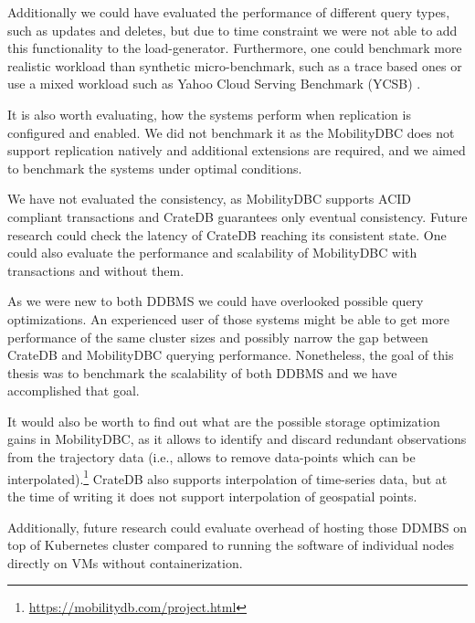 Additionally we could have evaluated the performance of different query types, such as updates and deletes, but due to time constraint we were not able to add this functionality to the load-generator.
Furthermore, one could benchmark more realistic workload than synthetic micro-benchmark, such as a trace based ones or use a mixed workload such as Yahoo Cloud Serving Benchmark (YCSB) \cite{cooperBenchmarkingCloudServing2010}.

It is also worth evaluating, how the systems perform when replication is configured and enabled.
We did not benchmark it as the MobilityDBC does not support replication natively and additional extensions are required, and we aimed to benchmark the systems under optimal conditions.

We have not evaluated the consistency, as MobilityDBC supports ACID compliant transactions and CrateDB guarantees only eventual consistency.
Future research could check the latency of CrateDB reaching its consistent state.
One could also evaluate the performance and scalability of MobilityDBC with transactions and without them.

As we were new to both DDBMS we could have overlooked possible query optimizations.
An experienced user of those systems might be able to get more performance of the same cluster sizes and possibly narrow the gap between CrateDB and MobilityDBC querying performance.
Nonetheless, the goal of this thesis was to benchmark the scalability of both DDBMS and we have accomplished that goal.

It would also be worth to find out what are the possible storage optimization gains in MobilityDBC, as it allows to identify and discard redundant observations from the trajectory data 
(i.e., allows to remove data-points which can be interpolated).\footnote{\url{https://mobilitydb.com/project.html}}
CrateDB also supports interpolation of time-series data, but at the time of writing it does not support interpolation of geospatial points.


Additionally, future research could evaluate overhead of hosting those DDMBS on top of Kubernetes cluster compared to running the software of individual nodes directly on VMs without containerization.

